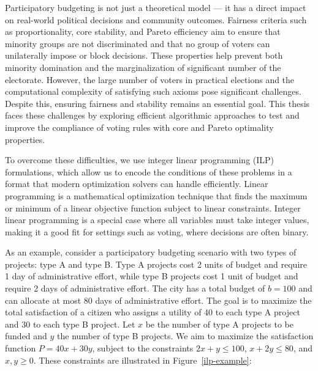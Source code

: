 \documentclass[magisterska,en]{pracamgr}
\begin{document}
Participatory budgeting is not just a theoretical model --- it has a direct impact on real-world political decisions and community outcomes. Fairness criteria such as proportionality, core stability, and Pareto efficiency aim to ensure that minority groups are not discriminated and that no group of voters can unilaterally impose or block decisions. These properties help prevent both minority domination and the marginalization of significant number of the electorate. However, the large number of voters in practical elections and the computational complexity of satisfying such axioms pose significant challenges. Despite this, ensuring fairness and stability remains an essential goal. This thesis faces these challenges by exploring efficient algorithmic approaches to test and improve the compliance of voting rules with core and Pareto optimality properties.

To overcome these difficulties, we use integer linear programming (ILP) formulations, which allow us to encode the conditions of these problems in a format that modern optimization solvers can handle efficiently. Linear programming is a mathematical optimization technique that finds the maximum or minimum of a linear objective function subject to linear constraints. Integer linear programming is a special case where all variables must take integer values, making it a good fit for settings such as voting, where decisions are often binary.

As an example, consider a participatory budgeting scenario with two types of projects: type A and type B. Type A projects cost 2 units of budget and require 1 day of administrative effort, while type B projects cost 1 unit of budget and require 2 days of administrative effort. The city has a total budget of $b=100$ and can allocate at most 80 days of administrative effort. The goal is to maximize the total satisfaction of a citizen who assigns a utility of 40 to each type A project and 30 to each type B project. Let $x$ be the number of type A projects to be funded and $y$ the number of type B projects. We aim to maximize the satisfaction function $P=40x+30y$, subject to the constraints $2x+y\leq100$, $x+2y\leq80$, and $x,y\geq0$. These constraints are illustrated in Figure~\ref{ilp-example}:
\end{document}

